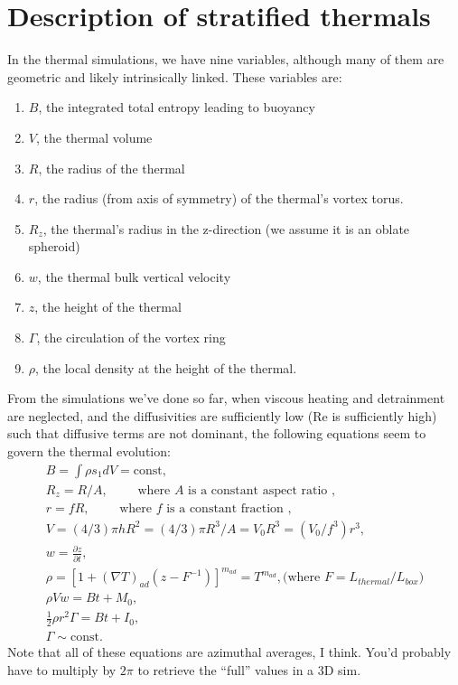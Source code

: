 \documentclass[onecolumn, amsmath, amsfonts, amssymb]{aastex62}
\newcommand{\grad}{\ensuremath{\nabla}}
\begin{document}
\section{Description of stratified thermals}
In the thermal simulations, we have nine variables, although many of them are geometric and
likely intrinsically linked. These variables are:
\begin{enumerate}
\item $B$, the integrated total entropy leading to buoyancy
\item $V$, the thermal volume
\item $R$, the radius of the thermal
\item $r$, the radius (from axis of symmetry) of the thermal's vortex torus.
\item $R_z$, the thermal's radius in the z-direction (we assume it is an oblate spheroid)
\item $w$, the thermal bulk vertical velocity
\item $z$, the height of the thermal
\item $\Gamma$, the circulation of the vortex ring
\item $\rho$, the local density at the height of the thermal.
\end{enumerate}
From the simulations we've done so far, when viscous heating and detrainment are neglected, and the
diffusivities are sufficiently low (Re is sufficiently high) such that diffusive terms are not dominant, the following
equations seem to govern the thermal evolution:
\begin{gather}
B = \int \rho s_1 dV = \text{const}, \\
R_z = R/A,\qquad \text{ where $A$ is a constant aspect ratio },\\
r = f R, \qquad \text{ where $f$ is a constant fraction }, \\
V = (4/3)\pi h R^2 = (4/3)\pi R^3/A = V_0 R^3 = (V_0/f^3) r^3, \\
w = \frac{\partial z}{\partial t},\\
\rho = [1 + (\grad T)_{ad}(z - F^{-1})]^{m_{ad}} = T^{m_{ad}}, \text{(where $F = L_{thermal}/L_{box}$)}\\
\rho V w = B t + M_0,  \label{eqn:momentum} \\
\frac{1}{2}\rho r^2 \Gamma = B t + I_0, \label{eqn:impulse} \\
\Gamma \sim \text{const.}
\end{gather}
Note that all of these equations are azimuthal averages, I think. You'd probably have to
multiply by $2\pi$ to retrieve the ``full'' values in a 3D sim.
\end{document}
